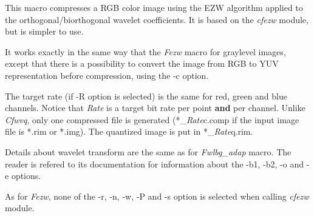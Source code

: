 This macro compresses a RGB color image using the EZW
algorithm applied to the orthogonal/biorthogonal wavelet coefficients. 
It is based on the {\em cfezw} module, but is simpler to use. 

It works exactly in the same way that the {\em Fezw} macro for graylevel 
images, except that there is a possibility to convert the image from 
RGB to YUV representation before compression, using the -c option. 

The target rate (if -R option is selected) is the same for red, green and 
blue channels. Notice that {\em Rate} is a target bit rate per point {\bf and} 
per channel. Unlike {\em Cfwvq}, only one compressed file is generated 
(*\_{\em Rate}c.comp if the input image file is *.rim or *.img). 
The quantized image is put in *\_{\em Rate}q.rim. 

Details about wavelet transform are the same as for {\em Fwlbg\_adap} macro. 
The reader is refered to its documentation for information about the -b1, -b2, 
-o and -e options. 

As for {\em Fezw}, none of the -r, -n, -w, -P and -s option is 
selected when calling {\em cfezw} module. 
